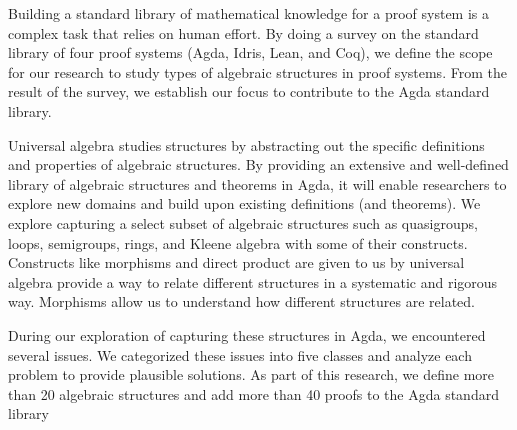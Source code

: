 Building a standard library of mathematical knowledge for a proof system is a
complex task that relies on human effort. By doing a survey on the standard library
of four proof systems (Agda, Idris, Lean, and Coq), we define the scope for our
research to study types of algebraic structures in proof systems. From the
result of the survey, we establish our focus to contribute to the Agda standard
library. 

Universal algebra studies structures by abstracting out the specific definitions
and properties of algebraic structures. By providing an extensive and
well-defined library of algebraic structures and theorems in Agda, it will
enable researchers to explore new domains and build upon existing definitions
(and theorems). We explore capturing a select subset of algebraic structures
such as quasigroups, loops, semigroups, rings, and Kleene algebra with some of
their constructs. Constructs like morphisms and direct product are given to us
by universal algebra provide a way to relate different structures in a
systematic and rigorous way. Morphisms allow us to understand how different
structures are related.

During our exploration of capturing these structures in Agda, we encountered
several issues. We categorized these issues into five classes and analyze each
problem to provide plausible solutions. As part
of this research, we define more than 20 algebraic structures and add more than
40 proofs to the Agda standard library